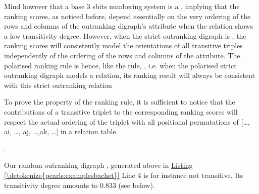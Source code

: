 \documentclass[a4paper,12pt,english]{sphinxhowto}
\begin{document}
\sphinxAtStartPar
Mind however that a base 3 sbits numbering system is a , implying that the  ranking scores, as noticed before, depend essentially on the very ordering of the rows and columns of the outranking digraph’s  attribute when the relation shows a low transitivity degree. However, when the strict outranking digraph is , the  ranking scores will consistently model the orientations of all transitive triples independently of the ordering of the rows and columns of the  attribute. The polarised  ranking rule is hence, like the  rule, , i.e. when the polarised strict outranking digraph models a  relation, its  ranking result will always be consistent with this strict outranking relation %
\begin{footnote}[23]\sphinxAtStartFootnote
To prove the  property of the  ranking rule, it is sufficient to notice that the contributions of a transitive triplet  to the corresponding  ranking scores will respect the actual ordering of the triplet with all positional permutations of {[}…, ai, …, aj, …,ak, …{]} in a relation table.
%
\end{footnote}.

\sphinxAtStartPar
Our random outranking digraph , generated above in \hyperref[\detokenize{pearls:examplesbachet}]{Listing \ref{\detokenize{pearls:examplesbachet}}} Line 4 is for instance not transitive. Its transitivity degree amounts to 0.833 (see below).
\end{document}
